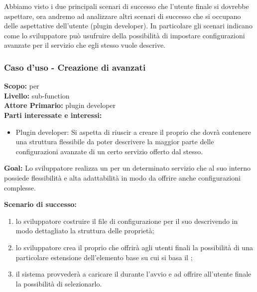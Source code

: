 \begin{flushleft}
\begin{boxedminipage}{\textwidth}
\end{boxedminipage}
\end{flushleft}
Abbiamo visto i due principali scenari di successo che l'utente finale si dovrebbe aspettare, ora andremo ad analizzare altri scenari di successo che si occupano delle aspettative dell'utente (plugin developer). In particolare gli scenari indicano come lo sviluppatore può usufruire della possibilità di impostare configurazioni avanzate per il servizio che egli stesso vuole descrive.

\begin{flushleft}
\begin{boxedminipage}{\textwidth}

\subsubsection*{Caso d'uso - Creazione di \plugin{} avanzati}

\textbf{Scopo:} \plugin{} per \visualnetkit{} \\
\textbf{Livello:} sub-function \\
\textbf{Attore Primario:} plugin developer \\
\textbf{Parti interessate e interessi:}
\begin{itemize}
\item Plugin developer: Si aspetta di riuscir a creare il proprio \plugin{} che dovrà contenere una struttura flessibile da poter descrivere la maggior parte delle configurazioni avanzate di un certo servizio offerto dal \plugin{} stesso.
\end{itemize}

\textbf{Goal:} Lo sviluppatore realizza un \plugin{} per un determinato servizio che al suo interno possiede flessibilità e alta adattabilità in modo da offrire anche configurazioni complesse.

\textbf{Scenario di successo:}
\begin{enumerate}
\item lo sviluppatore costruire il file di configurazione per il suo \plugin{} descrivendo in modo dettagliato la struttura delle proprietà;
\item lo sviluppatore crea il proprio \plugin{} che offrirà agli utenti finali la possibilità di una particolare estensione dell'elemento base su cui si basa il \plugin{};
\item il sistema provvederà a caricare il \plugin{} durante l'avvio e ad offrire all'utente finale la possibilità di selezionarlo.
\end{enumerate}

\end{boxedminipage}
\end{flushleft}

